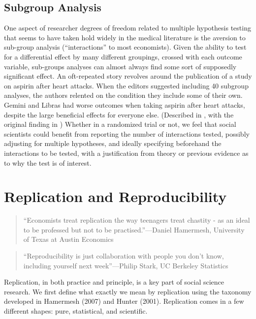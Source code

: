 \documentclass[12pt] {article}
\begin{document}
\subsection{Subgroup Analysis}
One aspect of researcher degrees of freedom related to multiple hypothesis testing that seems to have taken hold widely in the medical literature is the aversion to sub-group analysis (``interactions'' to
most economists). Given the ability to test for a differential effect by many different groupings, crossed with each outcome variable, sub-groups analyses can almost always find some sort of supposedly significant effect. An oft-repeated story revolves around the publication
of a study on aspirin after heart attacks. When the editors suggested
including 40 subgroup analyses, the authors relented on the condition
they include some of their own. Gemini and Libras had worse outcomes
when taking aspirin after heart attacks, despite the large beneficial
effects for everyone else. (Described in \cite{schulz_multiplicity_2005},
with the original finding in \cite{isis-2_second_international_study_of_infarct_survival_collaborative_group_randomised_1988}) Whether in a randomized trial or
not, we feel that social scientists could benefit from reporting the number of
interactions tested, possibly adjusting for multiple hypotheses, and
ideally specifying beforehand the interactions to be tested, with a justification from theory or previous evidence as to why the test is of interest. 

\section{Replication and
Reproducibility}\label{replication-and-reproducibility}

\begin{quote}
``Economists treat replication the way teenagers treat chastity - as an
ideal to be professed but not to be practised.''---Daniel Hamermesh,
University of Texas at Austin Economics
\end{quote}

\begin{quote}
``Reproducibility is just collaboration with people you don't know,
including yourself next week''---Philip Stark, UC Berkeley Statistics
\end{quote}

Replication, in both practice and principle, is a key part of social
science research. We first define what exactly we mean by replication
using the taxonomy developed in Hamermesh (2007) and Hunter (2001).
Replication comes in a few different shapes: pure, statistical, and
scientific.
\end{document}
